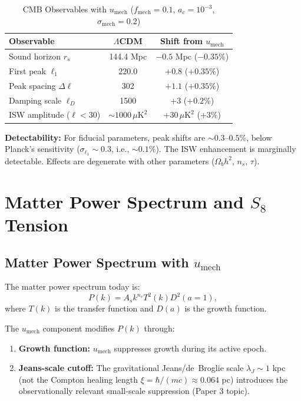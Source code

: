 \documentclass[11pt,a4paper]{article}
\newcommand{\umech}{\ensuremath{u_{\mathrm{mech}}}}
\newcommand{\fmech}{\ensuremath{f_{\mathrm{mech}}}}
\newcommand{\ac}{\ensuremath{a_c}}
\newcommand{\sigmamech}{\ensuremath{\sigma_{\mathrm{mech}}}}
\newcommand{\rs}{\ensuremath{r_s}}
\newcommand{\Omb}{\ensuremath{\Omega_b}}
\theoremstyle{definition}
\theoremstyle{remark}
\begin{document}
\begin{table}[H]
\centering
\caption{CMB Observables with $\umech$ ($\fmech = 0.1$, $\ac = 10^{-3}$, $\sigmamech = 0.2$)}
\label{tab:cmb_modifications}
\begin{tabular}{@{}lcc@{}}
\toprule
\textbf{Observable} & \textbf{$\Lambda$CDM} & \textbf{Shift from $\umech$} \\
\midrule
Sound horizon $\rs$ & 144.4 Mpc & $-0.5$ Mpc ($-0.35\%$) \\
First peak $\ell_1$ & 220.0 & $+0.8$ ($+0.35\%$) \\
Peak spacing $\Delta\ell$ & 302 & $+1.1$ ($+0.35\%$) \\
Damping scale $\ell_D$ & 1500 & $+3$ ($+0.2\%$) \\
ISW amplitude ($\ell < 30$) & $\sim 1000 \,\mu\mathrm{K}^2$ & $+30\,\mu\mathrm{K}^2$ ($+3\%$) \\
\bottomrule
\end{tabular}
\end{table}

\textbf{Detectability:} For fiducial parameters, peak shifts are $\sim 0.3$--$0.5\%$, below Planck's sensitivity ($\sigma_{\ell_1} \sim 0.3$, i.e., $\sim 0.1\%$). The ISW enhancement is marginally detectable. Effects are degenerate with other parameters ($\Omb h^2$, $n_s$, $\tau$).

\section{Matter Power Spectrum and $S_8$ Tension}
\label{sec:matter_spectrum}

\subsection{Matter Power Spectrum with $\umech$}
\label{sec:Pk_mech}

The matter power spectrum today is:
\begin{equation}
P(k) = A_s k^{n_s} T^2(k) D^2(a=1),
\end{equation}
where $T(k)$ is the transfer function and $D(a)$ is the growth function.

The $\umech$ component modifies $P(k)$ through:
\begin{enumerate}[leftmargin=*, itemsep=0.2em]
\item \textbf{Growth function:} $\umech$ suppresses growth during its active epoch.
\item \textbf{Jeans-scale cutoff:} The gravitational Jeans/de~Broglie scale $\lambda_J \sim 1$ kpc (not the Compton healing length $\xi = \hbar/(mc) \approx 0.064$ pc) introduces the observationally relevant small-scale suppression (Paper 3 topic).
\end{enumerate}
\end{document}
